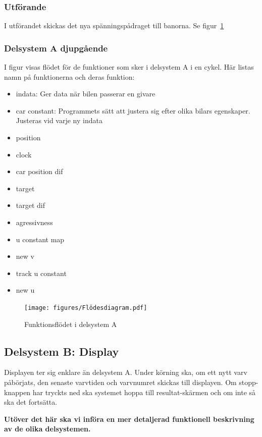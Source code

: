     \subsubsection{Utförande}

    	I utförandet skickas det nya spänningspådraget till banorna. 
	Se figur~\ref{fig:flow_diagram} 

    \subsubsection{Delsystem A djupgående}
	I figur visas flödet för de funktioner som sker i delsystem A i en cykel. 
	Här listas namn på funktionerna och deras funktion:
	\begin{itemize}
 		\item indata: Ger data när bilen passerar en givare
		\item car constant: Programmets sätt att justera sig efter olika bilars egenskaper. Justeras vid varje ny indata
 		\item position
 		\item clock
		\item car position dif
		\item target
		\item target dif
		\item agressivness
		\item u constant map	
		\item new v	
		\item track u constant
		\item new u
	\end{itemize}

	\begin{figure}
  	\centering
  	\texttt{[image: figures/Flödesdiagram.pdf]}
  	\caption{Funktionsflödet i delsystem A}
  	\label{fig:flow_diagram}
	\end{figure}


  \subsection{Delsystem B: Display}

  Displayen ter sig enklare än delsystem A. Under körning ska, om ett nytt varv
  påbörjats, den senaste varvtiden och varvnumret skickas till displayen. Om
  stopp-knappen har tryckts ned ska systemet hoppa till resultat-skärmen och om
  inte så ska det fortsätta.

  \textbf{Utöver det här ska vi införa en mer detaljerad funktionell beskrivning
  av de olika delsystemen.}
